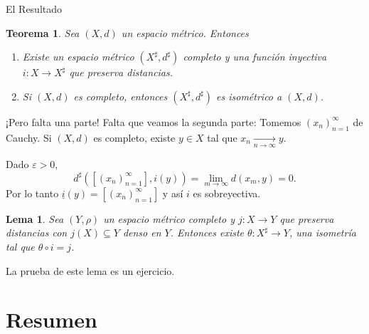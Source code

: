 \documentclass[utf8]{beamer}
\theoremstyle{plain}
\newtheorem{Th}{Teorema}               %
\newtheorem{Lem}{Lema}                 %
\theoremstyle{definition}
\theoremstyle{remark}
\numberwithin{equation}{section}
\newcommand{\eps}{\varepsilon}          %
\newcommand{\te}{\theta}                %
\newcommand{\un}{\underline}
\newcommand{\sucn}{_{n=1}^\infty} %
\begin{document}
\begin{frame}{El Resultado}
  \begin{Th}\label{thm:ExistenciaDeComplec}
    Sea $(X,d)$ un espacio métrico. Entonces 
    \begin{enumerate}
      \item Existe un espacio métrico $(X^\sharp,d^\sharp)$ completo y una función inyectiva $i:X\to X^\sharp$ que preserva distancias.
      \item Si $(X,d)$ es completo, entonces $(X^\sharp,d^\sharp)$ es isométrico a $(X,d)$.
    \end{enumerate}
  \end{Th}
 
\end{frame}

\begin{frame}{¡Pero falta una parte!}
  Falta que veamos la segunda parte: Tomemos $(x_n)\sucn$ de Cauchy. Si $(X,d)$ es completo, existe $y\in X$ tal que $x_n\xrightarrow[n\to\infty]{}y$.\par 
  Dado $\eps>0$, 
  $$d^\sharp([(x_n)\sucn],i(y))=\lim_{m\to\infty}d(x_m,y)=0.$$
  Por lo tanto $\un i(y)=[(x_n)\sucn]$ y así $i$ es sobreyectiva.

  \begin{Lem}\label{lem:propUnivEspacioCompleto}
    Sea $(Y,\rho)$ un espacio métrico completo y $j:X\to Y$ que preserva distancias con $j(X)\subseteq Y$ denso en $Y$. Entonces existe $\te: X^\sharp\to Y$, una isometría tal que $\te\circ i=j$.
  \end{Lem}
  La prueba de este lema es un \alert{ejercicio}.
\end{frame}
\section*{Resumen}
\end{document}
